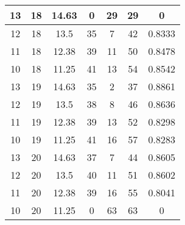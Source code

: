\documentclass[letterpaper, 12pt]{article}
\begin{document}
\begin{longtable}{|c|c|c|c|c|c|c|}
\hline
13 & 18 & 14.63 & 0 & 29 & 29 & 0 \\
\hline
12 & 18 & 13.5 & 35 & 7 & 42 & 0.8333 \\
\hline
11 & 18 & 12.38 & 39 & 11 & 50 & 0.8478 \\
\hline
10 & 18 & 11.25 & 41 & 13 & 54 & 0.8542 \\
\hline
13 & 19 & 14.63 & 35 & 2 & 37 & 0.8861 \\
\hline
12 & 19 & 13.5 & 38 & 8 & 46 & 0.8636 \\
\hline
11 & 19 & 12.38 & 39 & 13 & 52 & 0.8298 \\
\hline
10 & 19 & 11.25 & 41 & 16 & 57 & 0.8283 \\
\hline
13 & 20 & 14.63 & 37 & 7 & 44 & 0.8605 \\
\hline
12 & 20 & 13.5 & 40 & 11 & 51 & 0.8602 \\
\hline
11 & 20 & 12.38 & 39 & 16 & 55 & 0.8041 \\
\hline
10 & 20 & 11.25 & 0 & 63 & 63 & 0 \\
\hline
\end{longtable}
\end{document}
